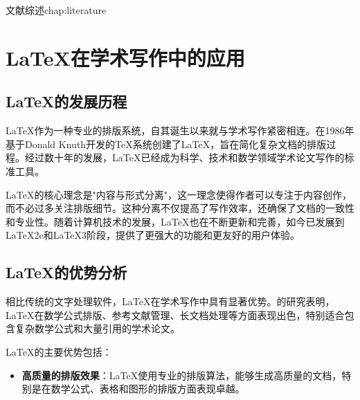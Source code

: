 \begin{cuzchapter}{文献综述}{chap:literature}


	\section{LaTeX在学术写作中的应用}\label{sec:latex-academic}
	
	\subsection{LaTeX的发展历程}
	
	\LaTeX{}作为一种专业的排版系统，自其诞生以来就与学术写作紧密相连。\citet{lamport1986document}在1986年基于Donald Knuth开发的\TeX{}系统创建了\LaTeX{}，旨在简化复杂文档的排版过程。经过数十年的发展，\LaTeX{}已经成为科学、技术和数学领域学术论文写作的标准工具。
	
	\LaTeX{}的核心理念是"内容与形式分离"，这一理念使得作者可以专注于内容创作，而不必过多关注排版细节。这种分离不仅提高了写作效率，还确保了文档的一致性和专业性。随着计算机技术的发展，\LaTeX{}也在不断更新和完善，如今已发展到\LaTeX2e和\LaTeX3阶段，提供了更强大的功能和更友好的用户体验。
	
	\subsection{LaTeX的优势分析}
	
	相比传统的文字处理软件，\LaTeX{}在学术写作中具有显著优势。\citet{stamerjohanns2009mathml}的研究表明，\LaTeX{}在数学公式排版、参考文献管理、长文档处理等方面表现出色，特别适合包含复杂数学公式和大量引用的学术论文。
	
	\LaTeX{}的主要优势包括：
	
	\begin{itemize}
		\item \textbf{高质量的排版效果}：\LaTeX{}使用专业的排版算法，能够生成高质量的文档，特别是在数学公式、表格和图形的排版方面表现卓越。
		

\end{itemize}
\end{cuzchapter}
